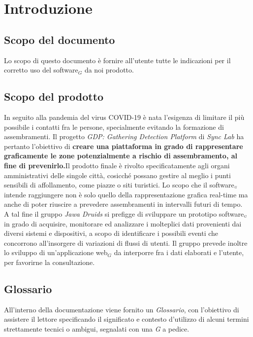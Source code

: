 \chapter{Introduzione}\label{Introduzione}

\section{Scopo del documento}\label{IntroduzioneScopoDelDocumento}

Lo scopo di questo documento è fornire all'utente tutte le indicazioni per il corretto uso del software$_G$ da noi prodotto.

\section{Scopo del prodotto}\label{IntroduzioneScopoDelProdotto}

In seguito alla pandemia del virus COVID-19 è nata l'esigenza di limitare il più possibile i
contatti fra le persone, specialmente evitando la formazione di assembramenti. 
Il progetto \textit{GDP: Gathering Detection Platform} di \textit{Sync Lab} ha pertanto l'obiettivo di \textbf{creare una piattaforma in grado di rappresentare graficamente le zone potenzialmente a rischio di assembramento, al fine di prevenirlo.}Il prodotto finale è rivolto specificatamente agli
organi amministrativi delle singole città, cosicché possano gestire al meglio i punti sensibili di
affollamento, come piazze o siti turistici. Lo scopo che il software$_{\scaleto{G}{3pt}}$ intende raggiungere non è
solo quello della rappresentazione grafica real-time ma anche di poter riuscire a prevedere
assembramenti in intervalli futuri di tempo.
\\
A tal fine il gruppo \textit{Jawa Druids} si prefigge di sviluppare un prototipo software$_{\scaleto{G}{3pt}}$ in grado di acquisire, monitorare ed analizzare i molteplici dati provenienti dai diversi sistemi e dispositivi, a scopo di identificare i possibili eventi che concorrono all'insorgere di variazioni di flussi di utenti. Il gruppo prevede inoltre lo sviluppo di un'applicazione web$_G$ da interporre fra i dati elaborati e l'utente, per favorirne la consultazione.

\section{Glossario}\label{IntroduzioneGlossario}

All'interno della documentazione viene fornito un \textit{Glossario}, con l'obiettivo di assistere il lettore specificando il significato e contesto d'utilizzo di alcuni termini strettamente tecnici o ambigui, segnalati con una \textit{G} a pedice.


